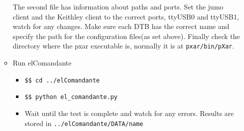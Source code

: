\documentclass[12pt]{unlsilabsop}
\begin{document}
\begin{enumerate}
\begin{itemize}
		The second file has information about paths and ports. Set the jumo client and the Keithley client to the correct ports, ttyUSB0 and ttyUSB1, watch for any changes. Make sure each DTB has the correct name and specify the path for the configuration files(as set above). Finally check the directory where the pxar executable is, normally it is at \texttt{pxar/bin/pXar}.
		\item Run elComandante
		\begin{itemize}
			\item \texttt{\$\$ cd ../elComandante}
			\item \texttt{\$\$ python el\_comandante.py}
			\item Wait until the test is complete and watch for any errors. Results are stored in \texttt{../elComandante/DATA/name}
		\end{itemize}
	\end{itemize}
   

\end{enumerate}
\end{document}
